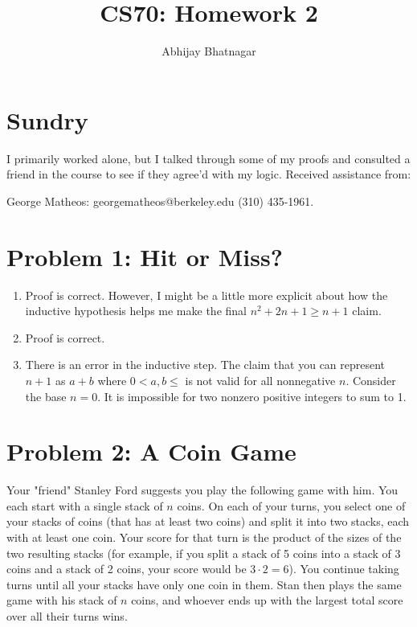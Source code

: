 \documentclass[11pt, notitlepage]{report}
\makeatletter
\newcommand*{\toccontents}{\@starttoc{toc}}
\makeatother
\begin{document}
   \title{CS70: Homework 2}
   \author{Abhijay Bhatnagar}
   \maketitle
   \toccontents



\setcounter{secnumdepth}{0} %
\section{Sundry}

I primarily worked alone, but I talked through some of my proofs and consulted a friend in the course to see if they agree'd with my logic. Received assistance from:

 George Matheos: georgematheos@berkeley.edu
(310) 435-1961.

\section{Problem 1: Hit or Miss?}

\begin{enumerate}[label=(\alph*)]
	\item Proof is correct. However, I might be a little more explicit about how the inductive hypothesis helps me make the final $n^2+2n+1  \ge n+1$ claim.
	\item Proof is correct.
	\item There is an error in the inductive step. The claim that you can represent $n+1$ as $a+b$ where $0<a,b\leq$ is not valid for all nonnegative $n$. Consider the base $n=0$. It is impossible for two nonzero positive integers to sum to 1.
\end{enumerate}

\newpage
\section{Problem 2: A Coin Game}

Your "friend" Stanley Ford suggests you play the following game with him.  You each start with a single stack of $n$ coins.  On each of your turns, you select one of your stacks of coins (that has at least two coins) and split it into two stacks, each with at least one coin.  Your score for that turn is the product of the sizes of the two resulting stacks (for example, if you split a stack of 5 coins into a stack of 3 coins and a stack of 2 coins, your score would be $3 \cdot 2 = 6$).  You continue taking turns until all your stacks have only one coin in them.  Stan then plays the same game with his stack of $n$ coins, and whoever ends up with the largest total score over all their turns wins.
\end{document}
